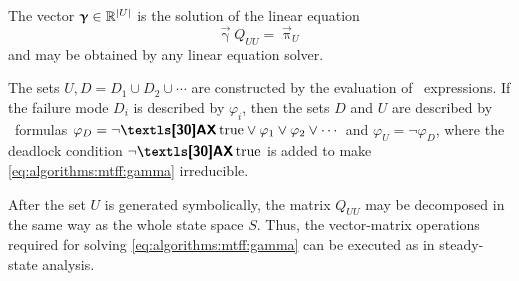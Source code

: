 The vector $\bm{\mathrm{\upgamma}} \in \mathbb{R}^{\lvert U \rvert}$ is the solution
of the linear equation
\begin{equation}
  \label{eq:algorithms:mtff:gamma}
  \vec{\upgamma} Q_{UU} = \vec{\uppi}_{U}
\end{equation}
and may be obtained by any linear equation solver.

The sets $U, D = D_1 \cup D_2 \cup \cdots$ are constructed by the
evaluation of \CTL\ expressions. If the failure mode $D_i$ is
described by $\varphi_i$, then the sets $D$ and $U$ are described by
\CTL\ formulas
$\varphi_D = \neg \ctlAX \KwTrue \lor \varphi_1 \lor \varphi_2 \lor
\cdots$
and $\varphi_U = \neg \varphi_D$, where the deadlock condition
$\neg \ctlAX \KwTrue$ is added to make \eqref{eq:algorithms:mtff:gamma}
irreducible.

After the set $U$ is generated symbolically, the matrix $Q_{UU}$ may be
decomposed in the same way as the whole state space $S$. Thus, the
vector-matrix operations required for solving
\eqref{eq:algorithms:mtff:gamma} can be executed as in steady-state
analysis.
